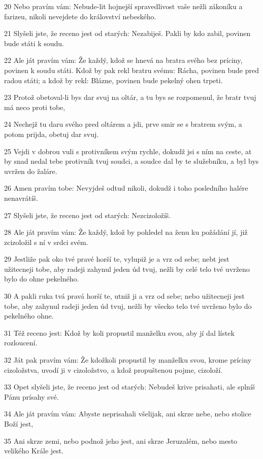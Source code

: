 \par 20 Nebo pravím vám: Nebude-lit hojnejší spravedlivost vaše nežli zákoníku a farizeu, nikoli nevejdete do království nebeského.
\par 21 Slyšeli jste, že receno jest od starých: Nezabiješ. Pakli by kdo zabil, povinen bude státi k soudu.
\par 22 Ale ját pravím vám: Že každý, kdož se hnevá na bratra svého bez príciny, povinen k soudu státi. Kdož by pak rekl bratru svému: Rácha, povinen bude pred radou státi; a kdož by rekl: Blázne, povinen bude pekelný ohen trpeti.
\par 23 Protož obetoval-li bys dar svuj na oltár, a tu bys se rozpomenul, že bratr tvuj má neco proti tobe,
\par 24 Nechejž tu daru svého pred oltárem a jdi, prve smir se s bratrem svým, a potom prijda, obetuj dar svuj.
\par 25 Vejdi v dobrou vuli s protivníkem svým rychle, dokudž jsi s ním na ceste, at by snad nedal tebe protivník tvuj soudci, a soudce dal by te služebníku, a byl bys uvržen do žaláre.
\par 26 Amen pravím tobe: Nevyjdeš odtud nikoli, dokudž i toho posledního halére nenavrátíš.
\par 27 Slyšeli jste, že receno jest od starých: Nezcizoložíš.
\par 28 Ale ját pravím vám: Že každý, kdož by pohledel na ženu ku požádání jí, již zcizoložil s ní v srdci svém.
\par 29 Jestliže pak oko tvé pravé horší te, vylupiž je a vrz od sebe; nebt jest užitecneji tobe, aby radeji zahynul jeden úd tvuj, nežli by celé telo tvé uvrženo bylo do ohne pekelného.
\par 30 A pakli ruka tvá pravá horší te, utniž ji a vrz od sebe; nebo užitecneji jest tobe, aby zahynul radeji jeden úd tvuj, nežli by všecko telo tvé uvrženo bylo do pekelného ohne.
\par 31 Též receno jest: Kdož by koli propustil manželku svou, aby jí dal lístek rozloucení.
\par 32 Ját pak pravím vám: Že kdožkoli propustil by manželku svou, krome príciny cizoložstva, uvodí ji v cizoložstvo, a kdož propuštenou pojme, cizoloží.
\par 33 Opet slyšeli jste, že receno jest od starých: Nebudeš krive prisahati, ale splníš Pánu prísahy své.
\par 34 Ale ját pravím vám: Abyste neprisahali všelijak, ani skrze nebe, nebo stolice Boží jest,
\par 35 Ani skrze zemi, nebo podnož jeho jest, ani skrze Jeruzalém, nebo mesto velikého Krále jest.
